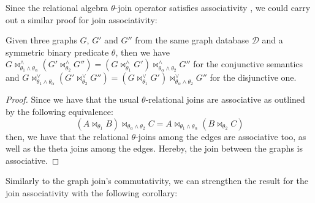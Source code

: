 Since the relational algebra $\theta$-join operator satisfies associativity \cite{Rolleke94equivalencesof}, we could carry out a similar
proof for join associativity:

\begin{lemma}
	Given three graphs $G$, $G'$ and $G''$ from the same graph database $\mathcal{D}$ and a symmetric binary predicate
	$\theta$, then we have $G\bowtie_{\theta_1\wedge\theta_\alpha}^\wedge (G'\bowtie_{\theta_2}^\wedge G'') = (G\bowtie_{\theta_1}^\wedge G')\bowtie_{\theta_\alpha\wedge \theta_2}^\wedge G''$ for the conjunctive
	semantics and $G\bowtie_{\theta_1\wedge\theta_\alpha}^\vee (G'\bowtie_{\theta_2}^\vee G'') = (G\bowtie_{\theta_1}^\vee G')\bowtie_{\theta_\alpha\wedge\theta_2}^\vee G''$ for the disjunctive one.
\end{lemma}
\begin{proof}
Since we have that the usual $\theta$-relational joins are associative as outlined by the following equivalence:
\[(A\bowtie_{\theta_1}B)\bowtie_{\theta_\alpha\wedge \theta_2}C =A\bowtie_{\theta_1\wedge\theta_\alpha}(B\bowtie_{\theta_2}C)\]
then, we have that the relational $\theta$-joins among the edges are associative too, as well as the theta joins among the edges. Hereby, the join between the graphs is associative. 
\end{proof}

Similarly to the graph join's commutativity, we can strengthen the result for the join associativity with the following corollary:

